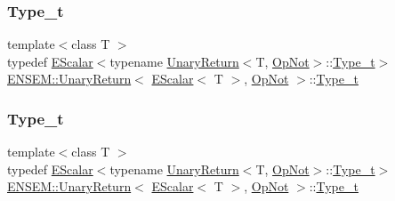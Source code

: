 \subsubsection{\texorpdfstring{Type\_t}{Type\_t}\hspace{0.1cm}{\footnotesize\ttfamily [1/3]}}
{\footnotesize\ttfamily template$<$class T $>$ \\
typedef \mbox{\hyperlink{classENSEM_1_1EScalar}{E\+Scalar}}$<$typename \mbox{\hyperlink{structENSEM_1_1UnaryReturn}{Unary\+Return}}$<$T, \mbox{\hyperlink{structENSEM_1_1OpNot}{Op\+Not}}$>$\+::\mbox{\hyperlink{structENSEM_1_1UnaryReturn_3_01EScalar_3_01T_01_4_00_01OpNot_01_4_a4e2b815087a9bd3d66be855deee7a1e5}{Type\+\_\+t}}$>$ \mbox{\hyperlink{structENSEM_1_1UnaryReturn}{E\+N\+S\+E\+M\+::\+Unary\+Return}}$<$ \mbox{\hyperlink{classENSEM_1_1EScalar}{E\+Scalar}}$<$ T $>$, \mbox{\hyperlink{structENSEM_1_1OpNot}{Op\+Not}} $>$\+::\mbox{\hyperlink{structENSEM_1_1UnaryReturn_3_01EScalar_3_01T_01_4_00_01OpNot_01_4_a4e2b815087a9bd3d66be855deee7a1e5}{Type\+\_\+t}}}

\mbox{\label{structENSEM_1_1UnaryReturn_3_01EScalar_3_01T_01_4_00_01OpNot_01_4_a4e2b815087a9bd3d66be855deee7a1e5}} 
\subsubsection{\texorpdfstring{Type\_t}{Type\_t}\hspace{0.1cm}{\footnotesize\ttfamily [2/3]}}
{\footnotesize\ttfamily template$<$class T $>$ \\
typedef \mbox{\hyperlink{classENSEM_1_1EScalar}{E\+Scalar}}$<$typename \mbox{\hyperlink{structENSEM_1_1UnaryReturn}{Unary\+Return}}$<$T, \mbox{\hyperlink{structENSEM_1_1OpNot}{Op\+Not}}$>$\+::\mbox{\hyperlink{structENSEM_1_1UnaryReturn_3_01EScalar_3_01T_01_4_00_01OpNot_01_4_a4e2b815087a9bd3d66be855deee7a1e5}{Type\+\_\+t}}$>$ \mbox{\hyperlink{structENSEM_1_1UnaryReturn}{E\+N\+S\+E\+M\+::\+Unary\+Return}}$<$ \mbox{\hyperlink{classENSEM_1_1EScalar}{E\+Scalar}}$<$ T $>$, \mbox{\hyperlink{structENSEM_1_1OpNot}{Op\+Not}} $>$\+::\mbox{\hyperlink{structENSEM_1_1UnaryReturn_3_01EScalar_3_01T_01_4_00_01OpNot_01_4_a4e2b815087a9bd3d66be855deee7a1e5}{Type\+\_\+t}}}

